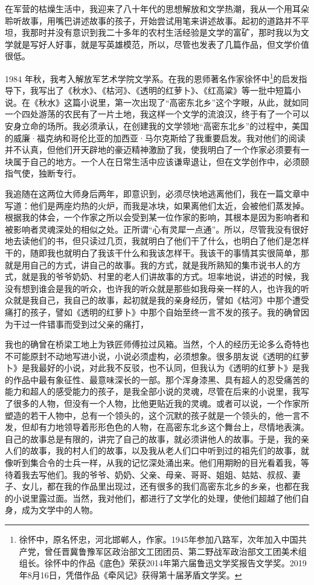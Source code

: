 \documentclass[fontset=fandol,12pt,a5paper]{ctexbook}
\begin{document}
在军营的枯燥生活中，我迎来了八十年代的思想解放和文学热潮，我从一个用耳朵聆听故事，用嘴巴讲述故事的孩子，开始尝试用笔来讲述故事。起初的道路并不平坦，我那时并没有意识到我二十多年的农村生活经验是文学的富矿，那时我以为文学就是写好人好事，就是写英雄模范，所以，尽管也发表了几篇作品，但文学价值很低。

1984 年秋，我考入解放军艺术学院文学系。在我的恩师著名作家徐怀中\footnote{徐怀中，原名怀忠，河北邯郸人，作家。1945年参加八路军，次年加入中国共产党，曾任晋冀鲁豫军区政治部文工团团员、第二野战军政治部文工团美术组组长。徐怀中的作品《底色》荣获2014年第六届鲁迅文学奖报告文学奖。2019年8月16日，凭借作品《牵风记》获得第十届茅盾文学奖。}的启发指导下，我写出了《秋水》、《枯河》、《透明的红萝卜》、《红高粱》等一批中短篇小说。在《秋水》这篇小说里，第一次出现了“高密东北乡”这个字眼，从此，就如同一个四处游荡的农民有了一片土地，我这样一个文学的流浪汉，终于有了一个可以安身立命的场所。我必须承认，在创建我的文学领地“高密东北乡”的过程中，美国的威廉·福克纳和哥伦比亚的加西亚·马尔克斯给了我重要启发。我对他们的阅读并不认真，但他们开天辟地的豪迈精神激励了我，使我明白了一个作家必须要有一块属于自己的地方。一个人在日常生活中应该谦卑退让，但在文学创作中，必须颐指气使，独断专行。

我追随在这两位大师身后两年，即意识到，必须尽快地逃离他们，我在一篇文章中写道：他们是两座灼热的火炉，而我是冰块，如果离他们太近，会被他们蒸发掉。根据我的体会，一个作家之所以会受到某一位作家的影响，其根本是因为影响者和被影响者灵魂深处的相似之处。正所谓“心有灵犀一点通”。所以，尽管我没有很好地去读他们的书，但只读过几页，我就明白了他们干了什么，也明白了他们是怎样干的，随即我也就明白了我该干什么和我该怎样干。我该干的事情其实很简单，那就是用自己的方式，讲自己的故事。我的方式，就是我所熟知的集市说书人的方式，就是我的爷爷奶奶、村里的老人们讲故事的方式。坦率地说，讲述的时候，我没有想到谁会是我的听众，也许我的听众就是那些如我母亲一样的人，也许我的听众就是我自己，我自己的故事，起初就是我的亲身经历，譬如《枯河》中那个遭受痛打的孩子，譬如《透明的红萝卜》中那个自始至终一言不发的孩子。我的确曾因为干过一件错事而受到过父亲的痛打，

我也的确曾在桥梁工地上为铁匠师傅拉过风箱。当然，个人的经历无论多么奇特也不可能原封不动地写进小说，小说必须虚构，必须想象。很多朋友说《透明的红萝卜》是我最好的小说，对此我不反驳，也不认同，但我认为《透明的红萝卜》是我的作品中最有象征性、最意味深长的一部。那个浑身漆黑、具有超人的忍受痛苦的能力和超人的感受能力的孩子，是我全部小说的灵魂，尽管在后来的小说里，我写了很多的人物，但没有一个人物，比他更贴近我的灵魂。或者可以说，一个作家所塑造的若干人物中，总有一个领头的，这个沉默的孩子就是一个领头的，他一言不发，但却有力地领导着形形色色的人物，在高密东北乡这个舞台上，尽情地表演。自己的故事总是有限的，讲完了自己的故事，就必须讲他人的故事。于是，我的亲人们的故事，我的村人们的故事，以及我从老人们口中听到过的祖先们的故事，就像听到集合令的士兵一样，从我的记忆深处涌出来。他们用期盼的目光看着我，等待着我去写他们。我的爷爷、奶奶、父亲、母亲、哥哥、姐姐、姑姑、叔叔、妻子、女儿，都在我的作品里出现过，还有很多的我们高密东北乡的乡亲，也都在我的小说里露过面。当然，我对他们，都进行了文学化的处理，使他们超越了他们自身，成为文学中的人物。
\end{document}
